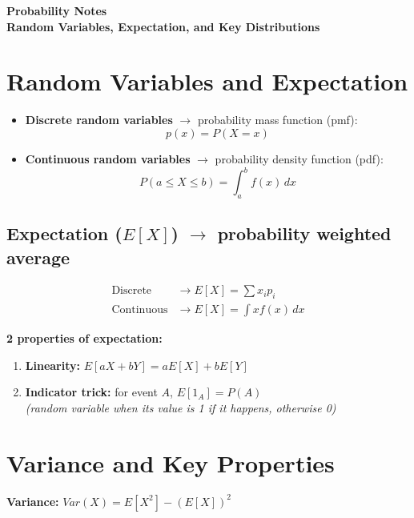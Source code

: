 \begin{center}
    \Large\textbf{\textcolor{primary}{Probability Notes}} \\
    \vspace{0.2cm}
    \large\textbf{\textcolor{secondary}{Random Variables, Expectation, and Key Distributions}}
\end{center}
\vspace{0.5cm}

\section{\textcolor{secondary}{Random Variables and Expectation}}

\begin{itemize}
    \item \textbf{Discrete random variables} $\rightarrow$ probability mass function (pmf): 
    \[ p(x) = P(X=x) \]
    \item \textbf{Continuous random variables} $\rightarrow$ probability density function (pdf): 
    \[ P(a \leq X \leq b) = \int_a^b f(x) \, dx \]
\end{itemize}

\subsection{Expectation ($E[X]$) $\rightarrow$ probability weighted average}
\begin{align*}
    \text{Discrete} &\rightarrow E[X] = \sum x_i p_i \\
    \text{Continuous} &\rightarrow E[X] = \int x f(x) \, dx
\end{align*}

\textbf{2 properties of expectation:}
\begin{enumerate}
    \item \textbf{Linearity:} $E[aX + bY] = aE[X] + bE[Y]$
    \item \textbf{Indicator trick:} for event $A$, $E[1_A] = P(A)$ 
    \\ \textit{(random variable when its value is 1 if it happens, otherwise 0)}
\end{enumerate}

\section{\textcolor{secondary}{Variance and Key Properties}}

\textbf{Variance:} $Var(X) = E[X^2] - (E[X])^2$

